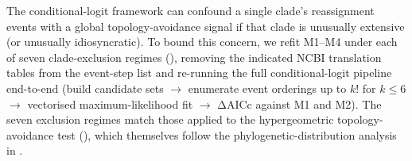\documentclass[preprint,11pt,authoryear,a4paper]{elsarticle}
\begin{document}
The conditional-logit framework can confound a single clade's
reassignment events with a global topology-avoidance signal if that
clade is unusually extensive (or unusually idiosyncratic). To bound this
concern, we refit M1--M4 under each of seven clade-exclusion regimes
(), removing the indicated NCBI translation
tables from the event-step list and re-running the full
conditional-logit pipeline end-to-end (build candidate sets
\(\rightarrow\) enumerate event orderings up to \(k!\) for \(k \leq 6\)
\(\rightarrow\) vectorised maximum-likelihood fit \(\rightarrow\) ΔAICc
against M1 and M2). The seven exclusion regimes match those applied to
the hypergeometric topology-avoidance test (), which
themselves follow the phylogenetic-distribution analysis in
\citep{sengupta2007}.
\end{document}
